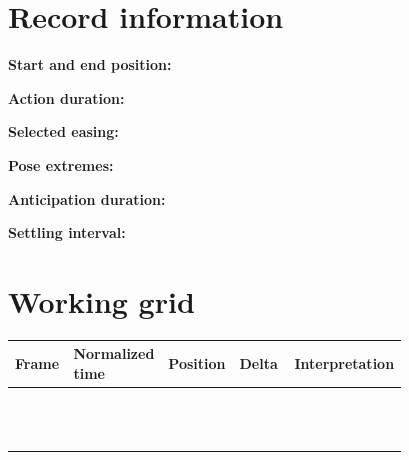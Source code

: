 \documentclass[10pt,letterpaper]{article}
\begin{document}
\makedoctitle
\makedocsummary

\section{Record information}
\noindent\textbf{Start and end position:}\quad\hrulefill\par\vspace{10pt}
\noindent\textbf{Action duration:}\quad\hrulefill\par\vspace{10pt}
\noindent\textbf{Selected easing:}\quad\hrulefill\par\vspace{10pt}
\noindent\textbf{Pose extremes:}\quad\hrulefill\par\vspace{10pt}
\noindent\textbf{Anticipation duration:}\quad\hrulefill\par\vspace{10pt}
\noindent\textbf{Settling interval:}\quad\hrulefill\par\vspace{10pt}\section{Working grid}
\begin{longtable}{|p{0.156\linewidth}|p{0.156\linewidth}|p{0.156\linewidth}|p{0.156\linewidth}|p{0.156\linewidth}|}
\hline
\textbf{Frame} & \textbf{Normalized time} & \textbf{Position} & \textbf{Delta} & \textbf{Interpretation}\\\hline
\endhead
\rule{0pt}{20pt} &  &  &  & \\\hline
\rule{0pt}{20pt} &  &  &  & \\\hline
\rule{0pt}{20pt} &  &  &  & \\\hline
\rule{0pt}{20pt} &  &  &  & \\\hline
\rule{0pt}{20pt} &  &  &  & \\\hline
\rule{0pt}{20pt} &  &  &  & \\\hline
\rule{0pt}{20pt} &  &  &  & \\\hline
\rule{0pt}{20pt} &  &  &  & \\\hline
\rule{0pt}{20pt} &  &  &  & \\\hline
\rule{0pt}{20pt} &  &  &  & \\\hline
\rule{0pt}{20pt} &  &  &  & \\\hline
\rule{0pt}{20pt} &  &  &  & \\\hline
\end{longtable}
\end{document}
